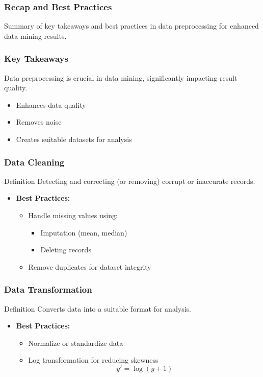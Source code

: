 \documentclass{beamer}
\begin{document}
\begin{frame}[fragile]
    \frametitle{Recap and Best Practices}
    Summary of key takeaways and best practices in data preprocessing for enhanced data mining results.
\end{frame}

\begin{frame}[fragile]
    \frametitle{Key Takeaways}
    Data preprocessing is crucial in data mining, significantly impacting result quality.
    \begin{itemize}
        \item Enhances data quality
        \item Removes noise
        \item Creates suitable datasets for analysis
    \end{itemize}
\end{frame}

\begin{frame}[fragile]
    \frametitle{Data Cleaning}
    \begin{block}{Definition}
        Detecting and correcting (or removing) corrupt or inaccurate records.
    \end{block}
    \begin{itemize}
        \item \textbf{Best Practices:}
        \begin{itemize}
            \item Handle missing values using:
            \begin{itemize}
                \item Imputation (mean, median)
                \item Deleting records
            \end{itemize}
            \item Remove duplicates for dataset integrity
        \end{itemize}
    \end{itemize}
\end{frame}

\begin{frame}[fragile]
    \frametitle{Data Transformation}
    \begin{block}{Definition}
        Converts data into a suitable format for analysis.
    \end{block}
    \begin{itemize}
        \item \textbf{Best Practices:}
        \begin{itemize}
            \item Normalize or standardize data
            \item Log transformation for reducing skewness 
            \begin{equation}
                y' = \log(y + 1)
            \end{equation}
        \end{itemize}
    \end{itemize}
\end{frame}
\end{document}
